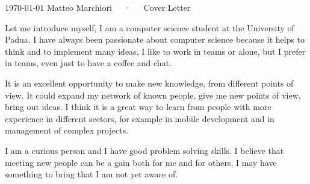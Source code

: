 \documentclass[11pt, a4paper]{awesome-cv}
\begin{document}
\makecvheader[R]

\makecvfooter
  {\today}
  {Matteo Marchiori~~~·~~~Cover Letter}
  {}

\makelettertitle

\begin{cvletter}

Let me introduce myself, I am a computer science student at the University of Padua.
I have always been passionate about computer science because it helps to think and to implement many ideas.
I like to work in teams or alone, but I prefer in teams, even just to have a coffee and chat.

It is an excellent opportunity to make new knowledge, from different points of view.
It could expand my network of known people, give me new points of view, bring out ideas.
I think it is a great way to learn from people with more experience in different sectors, for example in mobile development and in management of complex projects.

I am a curious person and I have good problem solving skills.
I believe that meeting new people can be a gain both for me and for others, I may have something to bring that I am not yet aware of.

\end{cvletter}


\makeletterclosing
\end{document}
